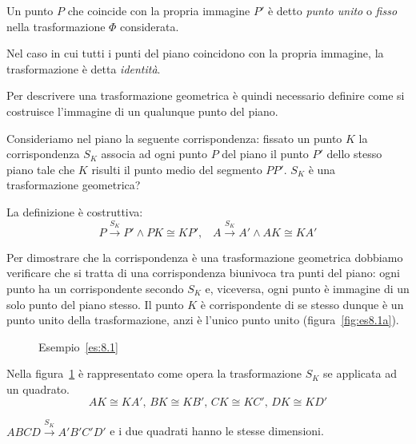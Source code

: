 \begin{definizione}
Un punto $P$ che coincide con la propria immagine $P'$ è detto 
\emph{punto unito} o \emph{fisso} nella trasformazione $\Phi$ 
considerata.
\end{definizione}

Nel caso in cui tutti i punti del piano coincidono con la propria 
immagine, la trasformazione è detta \emph{identità}.

Per descrivere una trasformazione geometrica è quindi necessario 
definire come si costruisce l'immagine di un qualunque punto del 
piano.

\begin{esempio}\label{es:8.1}
Consideriamo nel piano la seguente corrispondenza: fissato un punto 
$K$ la corrispondenza $S_K$ associa ad ogni punto $P$ del piano il 
punto $P'$ dello stesso piano tale che $K$ risulti il punto medio del 
segmento $PP'$. $S_K$ è una trasformazione geometrica?\vspace{7pt}

La definizione è costruttiva:
\[P\overset{S_K}{\rightarrow}P' \wedge PK\cong KP'\text{,} \quad  
A\overset{S_K}{\rightarrow}A' \wedge AK\cong KA'\]

Per dimostrare che la corrispondenza è una trasformazione geometrica 
dobbiamo verificare che si tratta di una corrispondenza biunivoca tra 
punti del piano: ogni punto ha un corrispondente secondo $S_K$ e, 
viceversa, ogni punto è immagine di un solo punto del piano stesso. 
Il punto $K$ è corrispondente di se stesso dunque è un punto unito 
della trasformazione, anzi è l'unico punto unito 
(figura~\ref{fig:es8.1a}).

\begin{inaccessibleblock}
 \begin{figure}[!htb]
\begin{center}
 \noindent\begin{minipage}{0.4\textwidth}
    \centering
  \caption{Esempio~\ref{es:8.1}}\label{fig:es8.1a}
 \end{minipage}
 \noindent\begin{minipage}{0.4\textwidth}
    \centering
    \caption{Esempio~\ref{es:8.1}}\label{fig:es8.1b}
 \end{minipage}
\end{center}
\end{figure}
\end{inaccessibleblock}

Nella figura~\ref{fig:es8.1b} è rappresentato come opera la 
trasformazione $S_K$ se applicata ad un quadrato.
\[AK\cong KA'\text{, }BK\cong KB'\text{, }CK\cong KC'\text{, }DK\cong 
KD'\]

$ABCD\overset{S_K}{\rightarrow}A'B'C'D'$ e i due quadrati hanno le 
stesse dimensioni.
\end{esempio}

